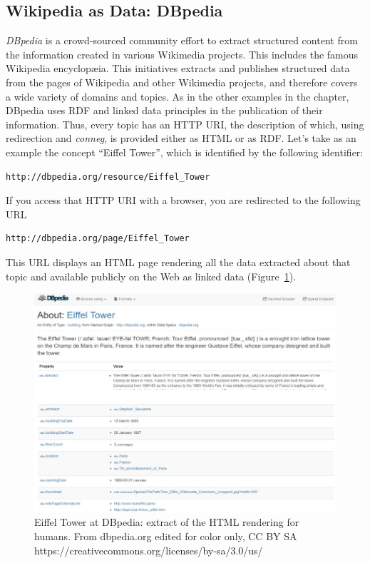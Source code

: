 \subsection{Wikipedia as Data: DBpedia}
\label{dbpedia}

\emph{DBpedia} is a crowd-sourced community effort to extract structured
content from the information created in various Wikimedia projects\cite{Auer:2007:DNW:1785162.1785216}. 
This includes the famous Wikipedia encyclop{\ae}ia.  This initiatives extracts
and publishes structured data from the pages of Wikipedia
and other Wikimedia projects, and therefore covers a wide variety of
domains and topics. As in the other examples in the chapter, DBpedia uses RDF and linked data 
principles in the publication of their information. 
Thus, every topic has an HTTP URI, the description of which, using redirection and \emph{conneg},  
is provided  either as
HTML or as 
RDF. Let's take as an example the concept ``Eiffel Tower'', which is identified by the
following identifier:

\begin{lstlisting}
http://dbpedia.org/resource/Eiffel_Tower
\end{lstlisting}

If you access that HTTP URI with a browser, you are redirected to the
following URL

\begin{lstlisting}
http://dbpedia.org/page/Eiffel_Tower
\end{lstlisting}

This URL displays an HTML page rendering all the data extracted about
that topic and available publicly on the Web as linked data (Figure~\ref{fig:ch5.7}).

\begin{figure}
    \centering
    \includegraphics[width=5in]{media/ch5/figure-05-07.jpg}
    \caption{Eiffel Tower at DBpedia: extract of the HTML rendering for humans. From dbpedia.org edited for color only, CC BY SA https://creativecommons.org/licenses/by-sa/3.0/us/}
    \label{fig:ch5.7}
\end{figure}

